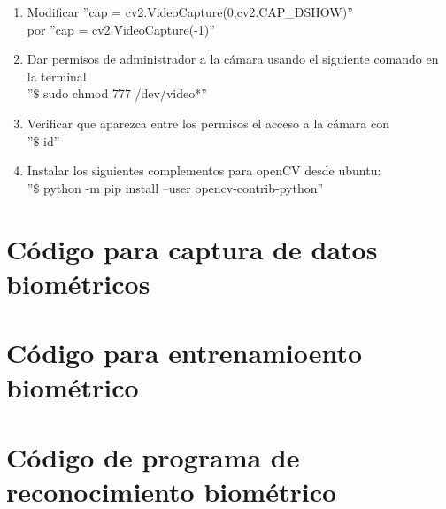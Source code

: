 \documentclass[12pt,letterpaper]{article}
\begin{document}
\begin{enumerate}
	\item Modificar ''cap = cv2.VideoCapture(0,cv2.CAP\_DSHOW)''\\
	por ''cap = cv2.VideoCapture(-1)''
	
	\item Dar permisos de administrador a la cámara usando el siguiente comando en la terminal\\
	''$\$$ sudo chmod 777 /dev/video*''
	
	\item Verificar que aparezca entre los permisos el acceso a la cámara con\\
	''$\$$ id''
	
	\item Instalar los siguientes complementos para openCV desde ubuntu:\\
	''$\$$ python -m pip install --user opencv-contrib-python''
\end{enumerate}


\clearpage

\section{Código para captura de datos biométricos}




\clearpage

\section{Código para entrenamioento biométrico}




\clearpage

\section{Código de programa de reconocimiento biométrico}


\end{document}
